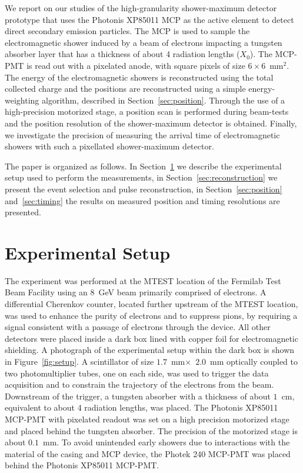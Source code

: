 \documentclass[12pt]{article}
\begin{document}
We report on our studies of the high-granularity shower-maximum detector prototype that uses the 
Photonis XP85011 MCP as the active element to detect direct secondary emission particles. 
The MCP is used to sample the electromagnetic shower induced by a beam of electrons impacting a 
tungsten absorber layer that has a thickness of about 4 radiation lengths ($X_{0}$). The
MCP-PMT is read out with a pixelated anode, with square pixels of size 
$6\times6$~$\mathrm{mm}^{2}$. The energy of the electromagnetic showers is reconstructed 
using the total collected charge and the positions are reconstructed using a simple
energy-weighting algorithm, described in Section~\ref{sec:position}.
Through the use of a high-precision motorized stage, a position scan is
performed during beam-tests and the position resolution of the shower-maximum
detector is obtained. Finally, we investigate the precision of measuring the
arrival time of electromagnetic showers with such a pixellated shower-maximum
detector.

The paper is organized as follows. In Section~\ref{sec:setup} we describe the
experimental setup used to perform the measurements, in
Section~\ref{sec:reconstruction} we present the event selection and pulse
reconstruction, in Section~\ref{sec:position} and~\ref{sec:timing} the results
on measured position and timing resolutions are presented. 

\section{Experimental Setup} \label{sec:setup} The experiment was performed at
the MTEST location of the Fermilab Test Beam Facility using an $8$~GeV beam
primarily comprised of electrons. A differential Cherenkov counter, located
further upstream of the MTEST location, was used to enhance the purity of
electrons and to suppress pions, by requiring a signal consistent with a passage
of electrons through the device. All other detectors were placed inside a dark
box lined with copper foil for electromagnetic shielding. A photograph of the
experimental setup within the dark box is shown in Figure~\ref{fig:setup}. A
scintillator of size $1.7$~mm$\times$~$2.0$~mm optically coupled to two
photomultiplier tubes, one on each side, was used to trigger the data
acquisition and to constrain the trajectory of the electrons from the beam.
Downstream of the trigger, a tungsten absorber with a thickness of about $1$~cm,
equivalent to about 4 radiation lengths, was placed. The Photonis XP85011
MCP-PMT with pixelated readout was set on a high precision motorized stage and
placed behind the tungsten absorber. The precision of the motorized stage is
about $0.1$~mm. To avoid unintended early showers due to interactions with the
material of the casing and MCP device, the Photek 240 MCP-PMT was placed behind
the Photonis XP85011 MCP-PMT. 
\end{document}

